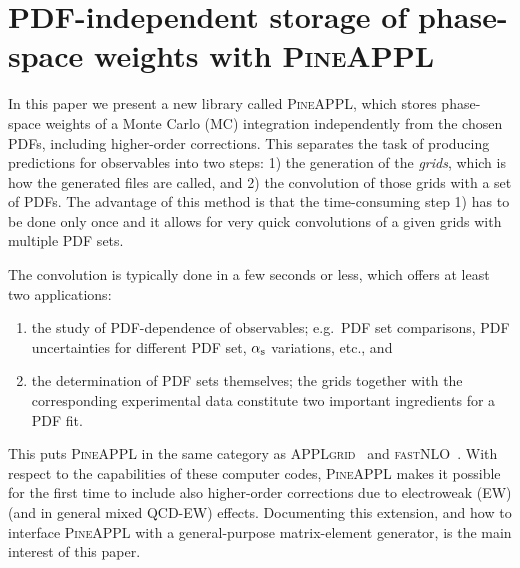 \section{PDF-independent storage of phase-space weights with \texorpdfstring{\textsc{PineAPPL}}{PineAPPL}}
\label{sec:pineappl}

In this paper we present a new library called \textsc{PineAPPL}, which stores phase-space weights of a Monte Carlo (MC) integration independently from the chosen PDFs,
including higher-order corrections.
This separates the task of producing predictions for observables into two steps: 1) the generation of the \emph{grids}, which is how the generated files are called, and 2) the convolution of those grids with a set of PDFs.
The advantage of this method is that the time-consuming step 1) has to be done only once and it allows for very quick convolutions of a given grids with multiple PDF sets.

The convolution is typically done in a few seconds or less, which offers at least two applications:
\begin{enumerate}
\item the study of PDF-dependence of observables; e.g.\ PDF set comparisons, PDF uncertainties for different PDF set, $\alpha_\mathrm{s}$ variations, etc., and
\item the determination of PDF sets themselves; the grids together with the corresponding experimental data constitute two important ingredients for a PDF fit.
\end{enumerate}
This puts \textsc{PineAPPL} in the same category as \textsc{APPLgrid}~\cite{Carli:2010rw} and \textsc{fastNLO}~\cite{Kluge:2006xs,Wobisch:2011ij,Britzger:2012bs}. With
respect to the capabilities of these computer codes, \textsc{PineAPPL} makes it possible for the first time to include also higher-order corrections due to electroweak (EW)
(and in general mixed QCD-EW) effects. Documenting this extension, and how to interface \textsc{PineAPPL} with a general-purpose matrix-element generator, is the main interest of this paper.


